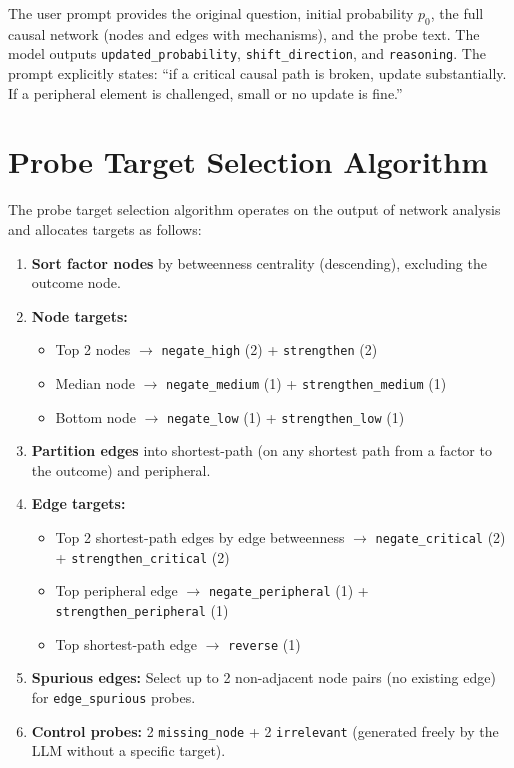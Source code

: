 \documentclass[11pt]{article}
\begin{document}
The user prompt provides the original question, initial probability $p_0$, the full causal network (nodes and edges with mechanisms), and the probe text. The model outputs \texttt{updated\_probability}, \texttt{shift\_direction}, and \texttt{reasoning}. The prompt explicitly states: ``if a critical causal path is broken, update substantially. If a peripheral element is challenged, small or no update is fine.''

\section{Probe Target Selection Algorithm}
\label{app:target-selection}

The probe target selection algorithm operates on the output of network analysis and allocates targets as follows:

\begin{enumerate}
\item \textbf{Sort factor nodes} by betweenness centrality (descending), excluding the outcome node.
\item \textbf{Node targets:}
    \begin{itemize}
    \item Top 2 nodes $\rightarrow$ \texttt{negate\_high} (2) + \texttt{strengthen} (2)
    \item Median node $\rightarrow$ \texttt{negate\_medium} (1) + \texttt{strengthen\_medium} (1)
    \item Bottom node $\rightarrow$ \texttt{negate\_low} (1) + \texttt{strengthen\_low} (1)
    \end{itemize}
\item \textbf{Partition edges} into shortest-path (on any shortest path from a factor to the outcome) and peripheral.
\item \textbf{Edge targets:}
    \begin{itemize}
    \item Top 2 shortest-path edges by edge betweenness $\rightarrow$ \texttt{negate\_critical} (2) + \texttt{strengthen\_critical} (2)
    \item Top peripheral edge $\rightarrow$ \texttt{negate\_peripheral} (1) + \texttt{strengthen\_peripheral} (1)
    \item Top shortest-path edge $\rightarrow$ \texttt{reverse} (1)
    \end{itemize}
\item \textbf{Spurious edges:} Select up to 2 non-adjacent node pairs (no existing edge) for \texttt{edge\_spurious} probes.
\item \textbf{Control probes:} 2 \texttt{missing\_node} + 2 \texttt{irrelevant} (generated freely by the LLM without a specific target).
\end{enumerate}
\end{document}
